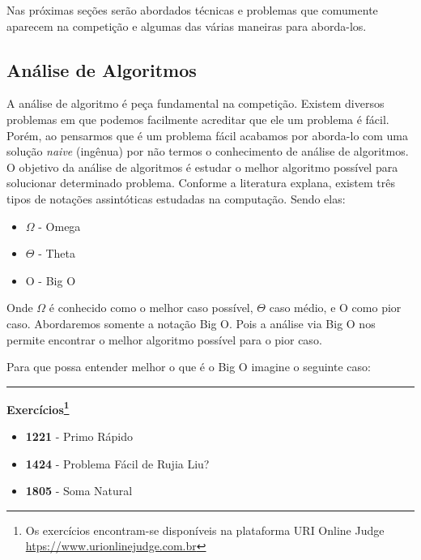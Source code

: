Nas próximas seções serão abordados técnicas e problemas que comumente aparecem na competição e algumas das várias maneiras para aborda-los.

\subsection{Análise de Algoritmos}
A análise de algoritmo é peça fundamental na competição. Existem diversos problemas em que podemos facilmente acreditar que ele um problema é fácil. Porém, ao pensarmos que é um problema fácil acabamos por aborda-lo com uma solução \textit{naive} (ingênua) por não termos o conhecimento de análise de algoritmos. O objetivo da análise de algoritmos é estudar o melhor algoritmo possível para solucionar determinado problema.
Conforme a literatura explana, existem três tipos de notações assintóticas estudadas na computação. Sendo elas:

    \begin{itemize}
        \item $\Omega$ - Omega
        \item $\Theta$ - Theta
        \item O - Big O
    \end{itemize}
    
    Onde $\Omega$ é conhecido como o melhor caso possível, $\Theta$ caso médio, e O como pior caso. Abordaremos somente a notação Big O. Pois a análise via Big O nos permite encontrar o melhor algoritmo possível para o pior caso.
    
    Para que possa entender melhor o que é o Big O imagine o seguinte caso: 
    
    
    

\vspace{1cm}
\rule{\textwidth}{0.4pt}
\large{\textbf{Exercícios\footnote{Os exercícios encontram-se disponíveis na plataforma URI Online Judge \url{htps://www.urionlinejudge.com.br}}}}\\

\begin{itemize}
    \item \textbf{1221} - Primo Rápido
    \item \textbf{1424} - Problema Fácil de Rujia Liu?
    \item \textbf{1805} - Soma Natural
\end{itemize}

\newpage